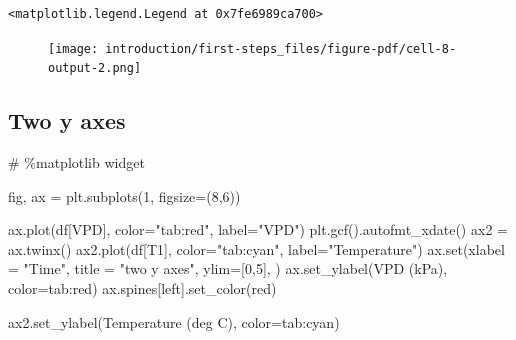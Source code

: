 \documentclass[
  letterpaper,
  DIV=11,
  numbers=noendperiod,
  oneside]{scrreprt}
\newenvironment{Shaded}{\begin{snugshade}}{\end{snugshade}}
\newcommand{\BuiltInTok}[1]{\textcolor[rgb]{0.00,0.23,0.31}{#1}}
\newcommand{\CommentTok}[1]{\textcolor[rgb]{0.37,0.37,0.37}{#1}}
\newcommand{\DecValTok}[1]{\textcolor[rgb]{0.68,0.00,0.00}{#1}}
\newcommand{\NormalTok}[1]{\textcolor[rgb]{0.00,0.23,0.31}{#1}}
\newcommand{\OperatorTok}[1]{\textcolor[rgb]{0.37,0.37,0.37}{#1}}
\newcommand{\StringTok}[1]{\textcolor[rgb]{0.13,0.47,0.30}{#1}}
\begin{document}
\begin{verbatim}
<matplotlib.legend.Legend at 0x7fe6989ca700>
\end{verbatim}

\begin{figure}[H]

{\centering \texttt{[image: introduction/first-steps\_files/figure-pdf/cell-8-output-2.png]}

}

\end{figure}

\hypertarget{two-y-axes}{%
\subsection{Two y axes}\label{two-y-axes}}

\begin{Shaded}
\begin{Highlighting}[]
\CommentTok{\# \%matplotlib widget}

\NormalTok{fig, ax }\OperatorTok{=}\NormalTok{ plt.subplots(}\DecValTok{1}\NormalTok{, figsize}\OperatorTok{=}\NormalTok{(}\DecValTok{8}\NormalTok{,}\DecValTok{6}\NormalTok{))}

\NormalTok{ax.plot(df[}\StringTok{\textquotesingle{}VPD\textquotesingle{}}\NormalTok{], color}\OperatorTok{=}\StringTok{"tab:red"}\NormalTok{, label}\OperatorTok{=}\StringTok{"VPD"}\NormalTok{)}
\NormalTok{plt.gcf().autofmt\_xdate()}
\NormalTok{ax2 }\OperatorTok{=}\NormalTok{ ax.twinx()}
\NormalTok{ax2.plot(df[}\StringTok{\textquotesingle{}T1\textquotesingle{}}\NormalTok{], color}\OperatorTok{=}\StringTok{"tab:cyan"}\NormalTok{, label}\OperatorTok{=}\StringTok{"Temperature"}\NormalTok{)}
\NormalTok{ax.}\BuiltInTok{set}\NormalTok{(xlabel }\OperatorTok{=} \StringTok{"Time"}\NormalTok{,}
\NormalTok{       title }\OperatorTok{=} \StringTok{"two y axes"}\NormalTok{,}
\NormalTok{       ylim}\OperatorTok{=}\NormalTok{[}\DecValTok{0}\NormalTok{,}\DecValTok{5}\NormalTok{],}
\NormalTok{       )}
\NormalTok{ax.set\_ylabel(}\StringTok{\textquotesingle{}VPD (kPa)\textquotesingle{}}\NormalTok{, color}\OperatorTok{=}\StringTok{\textquotesingle{}tab:red\textquotesingle{}}\NormalTok{)}
\NormalTok{ax.spines[}\StringTok{\textquotesingle{}left\textquotesingle{}}\NormalTok{].set\_color(}\StringTok{\textquotesingle{}red\textquotesingle{}}\NormalTok{)}

\NormalTok{ax2.set\_ylabel(}\StringTok{\textquotesingle{}Temperature (deg C)\textquotesingle{}}\NormalTok{, color}\OperatorTok{=}\StringTok{\textquotesingle{}tab:cyan\textquotesingle{}}\NormalTok{)}
\end{Highlighting}
\end{Shaded}
\end{document}
